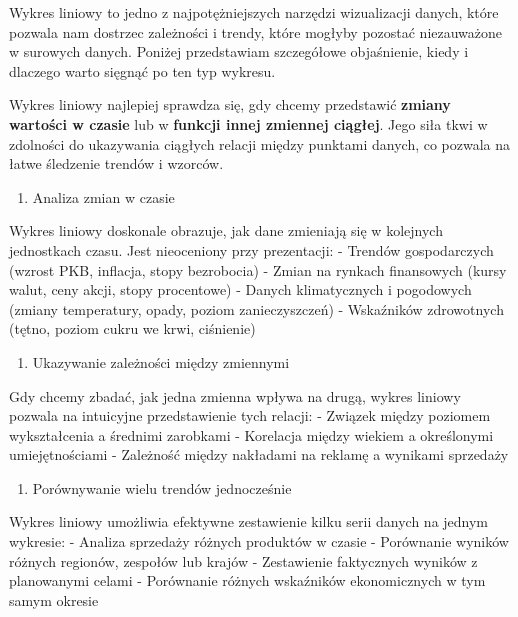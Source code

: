 \documentclass[
  polish,
  letterpaper,
  DIV=11,
  numbers=noendperiod]{scrreprt}
\providecommand{\tightlist}{%
  \setlength{\itemsep}{0pt}\setlength{\parskip}{0pt}}
\begin{document}
Wykres liniowy to jedno z najpotężniejszych narzędzi wizualizacji
danych, które pozwala nam dostrzec zależności i trendy, które mogłyby
pozostać niezauważone w surowych danych. Poniżej przedstawiam
szczegółowe objaśnienie, kiedy i dlaczego warto sięgnąć po ten typ
wykresu.

Wykres liniowy najlepiej sprawdza się, gdy chcemy przedstawić
\textbf{zmiany wartości w czasie} lub w \textbf{funkcji innej zmiennej
ciągłej}. Jego siła tkwi w zdolności do ukazywania ciągłych relacji
między punktami danych, co pozwala na łatwe śledzenie trendów i wzorców.

\begin{enumerate}
\def\labelenumi{\arabic{enumi}.}
\tightlist
\item
  Analiza zmian w czasie
\end{enumerate}

Wykres liniowy doskonale obrazuje, jak dane zmieniają się w kolejnych
jednostkach czasu. Jest nieoceniony przy prezentacji: - Trendów
gospodarczych (wzrost PKB, inflacja, stopy bezrobocia) - Zmian na
rynkach finansowych (kursy walut, ceny akcji, stopy procentowe) - Danych
klimatycznych i pogodowych (zmiany temperatury, opady, poziom
zanieczyszczeń) - Wskaźników zdrowotnych (tętno, poziom cukru we krwi,
ciśnienie)

\begin{enumerate}
\def\labelenumi{\arabic{enumi}.}
\setcounter{enumi}{1}
\tightlist
\item
  Ukazywanie zależności między zmiennymi
\end{enumerate}

Gdy chcemy zbadać, jak jedna zmienna wpływa na drugą, wykres liniowy
pozwala na intuicyjne przedstawienie tych relacji: - Związek między
poziomem wykształcenia a średnimi zarobkami - Korelacja między wiekiem a
określonymi umiejętnościami - Zależność między nakładami na reklamę a
wynikami sprzedaży

\begin{enumerate}
\def\labelenumi{\arabic{enumi}.}
\setcounter{enumi}{2}
\tightlist
\item
  Porównywanie wielu trendów jednocześnie
\end{enumerate}

Wykres liniowy umożliwia efektywne zestawienie kilku serii danych na
jednym wykresie: - Analiza sprzedaży różnych produktów w czasie -
Porównanie wyników różnych regionów, zespołów lub krajów - Zestawienie
faktycznych wyników z planowanymi celami - Porównanie różnych wskaźników
ekonomicznych w tym samym okresie
\end{document}
